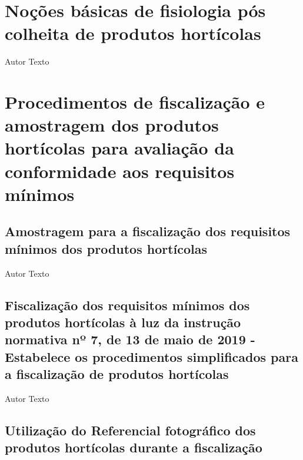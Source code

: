 \documentclass[
]{book}
\begin{document}
\hypertarget{nouxe7uxf5es-buxe1sicas-de-fisiologia-puxf3s-colheita-de-produtos-hortuxedcolas}{%
\chapter{Noções básicas de fisiologia pós colheita de produtos hortícolas}\label{nouxe7uxf5es-buxe1sicas-de-fisiologia-puxf3s-colheita-de-produtos-hortuxedcolas}}

Autor
Texto

\hypertarget{req}{%
\chapter{Procedimentos de fiscalização e amostragem dos produtos hortícolas para avaliação da conformidade aos requisitos mínimos}\label{req}}

\hypertarget{amostragem-para-a-fiscalizauxe7uxe3o-dos-requisitos-muxednimos-dos-produtos-hortuxedcolas}{%
\section{Amostragem para a fiscalização dos requisitos mínimos dos produtos hortícolas}\label{amostragem-para-a-fiscalizauxe7uxe3o-dos-requisitos-muxednimos-dos-produtos-hortuxedcolas}}

Autor
Texto

\hypertarget{fiscalizauxe7uxe3o-dos-requisitos-muxednimos-dos-produtos-hortuxedcolas-uxe0-luz-da-instruuxe7uxe3o-normativa-nuxba-7-de-13-de-maio-de-2019---estabelece-os-procedimentos-simplificados-para-a-fiscalizauxe7uxe3o-de-produtos-hortuxedcolas}{%
\section{Fiscalização dos requisitos mínimos dos produtos hortícolas à luz da instrução normativa nº 7, de 13 de maio de 2019 - Estabelece os procedimentos simplificados para a fiscalização de produtos hortícolas}\label{fiscalizauxe7uxe3o-dos-requisitos-muxednimos-dos-produtos-hortuxedcolas-uxe0-luz-da-instruuxe7uxe3o-normativa-nuxba-7-de-13-de-maio-de-2019---estabelece-os-procedimentos-simplificados-para-a-fiscalizauxe7uxe3o-de-produtos-hortuxedcolas}}

Autor
Texto

\hypertarget{utilizauxe7uxe3o-do-referencial-fotogruxe1fico-dos-produtos-hortuxedcolas-durante-a-fiscalizauxe7uxe3o}{%
\section{Utilização do Referencial fotográfico dos produtos hortícolas durante a fiscalização}\label{utilizauxe7uxe3o-do-referencial-fotogruxe1fico-dos-produtos-hortuxedcolas-durante-a-fiscalizauxe7uxe3o}}
\end{document}
